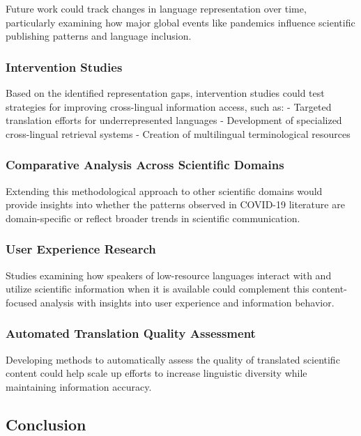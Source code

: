 \documentclass[
]{article}
\begin{document}
Future work could track changes in language representation over time,
particularly examining how major global events like pandemics influence
scientific publishing patterns and language inclusion.

\subsubsection{Intervention Studies}\label{intervention-studies}

Based on the identified representation gaps, intervention studies could
test strategies for improving cross-lingual information access, such as:
- Targeted translation efforts for underrepresented languages -
Development of specialized cross-lingual retrieval systems - Creation of
multilingual terminological resources

\subsubsection{Comparative Analysis Across Scientific
Domains}\label{comparative-analysis-across-scientific-domains}

Extending this methodological approach to other scientific domains would
provide insights into whether the patterns observed in COVID-19
literature are domain-specific or reflect broader trends in scientific
communication.

\subsubsection{User Experience Research}\label{user-experience-research}

Studies examining how speakers of low-resource languages interact with
and utilize scientific information when it is available could complement
this content-focused analysis with insights into user experience and
information behavior.

\subsubsection{Automated Translation Quality
Assessment}\label{automated-translation-quality-assessment}

Developing methods to automatically assess the quality of translated
scientific content could help scale up efforts to increase linguistic
diversity while maintaining information accuracy.

\subsection{Conclusion}\label{conclusion}
\end{document}
